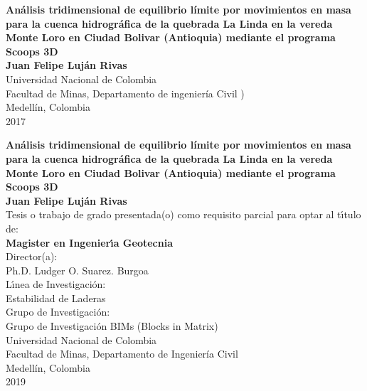 \begin{center}
\begin{figure}
\centering%
%
\end{figure}
\thispagestyle{empty} \vspace*{1.5cm} \textbf{\huge
An\'{a}lisis tridimensional de equilibrio l\'{i}mite por movimientos en masa para la cuenca hidrogr\'{a}fica de la quebrada La Linda en la vereda Monte Loro en Ciudad Bolivar (Antioquia) mediante el programa Scoops 3D}\\[4.0cm]
\Large\textbf{Juan Felipe Luj\'{a}n Rivas}\\[4.0cm]
\small Universidad Nacional de Colombia\\
Facultad de Minas, Departamento de ingenier\'{i}a Civil )\\
Medell\'{i}n, Colombia\\
2017\\
\end{center}

\newpage{\pagestyle{empty}\cleardoublepage}

\newpage
\begin{center}
\thispagestyle{empty} \vspace*{0cm} \textbf{\huge
An\'{a}lisis tridimensional de equilibrio l\'{i}mite por movimientos en masa para la cuenca hidrogr\'{a}fica de la quebrada La Linda en la vereda Monte Loro en Ciudad Bolivar (Antioquia) mediante el programa Scoops 3D}\\[2.0cm]
\Large\textbf{Juan Felipe Luj\'{a}n Rivas}\\[2.0cm]
\small Tesis o trabajo de grado presentada(o) como requisito parcial para optar al
t\'{\i}tulo de:\\
\textbf{ Magister en Ingenier\'{\i}a Geotecnia}\\[1.5cm]
Director(a):\\
Ph.D. Ludger O. Suarez. Burgoa\\[1.0cm]
L\'{\i}nea de Investigaci\'{o}n:\\
Estabilidad de Laderas\\
Grupo de Investigaci\'{o}n:\\
Grupo de Investigaci\'{o}n BIMs (Blocks in Matrix)\\[0.5cm]
Universidad Nacional de Colombia\\
Facultad de Minas, Departamento de Ingenier\'{i}a Civil\\
Medell\'in, Colombia\\
2019\\
\end{center}



